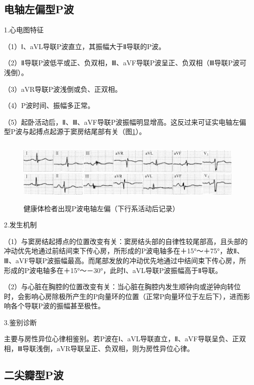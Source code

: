 \protect\hypertarget{text00007.htmlux5cux23subid3}{}{}

\subsection{电轴左偏型P波}

1.心电图特征

（1）Ⅰ、aVL导联P波直立，其振幅大于Ⅱ导联的P波。

（2）Ⅱ导联P波低平或正、负双相，Ⅲ、aVF导联P波呈正、负双相（Ⅲ导联P波可浅倒）。

（3）aVR导联P波浅倒或负、正双相。

（4）P波时间、振幅多正常。

（5）起卧活动后，Ⅱ、Ⅲ、aVF导联P波振幅明显增高。这反过来可证实电轴左偏型P波与起搏点起源于窦房结尾部有关（图\ref{fig1-1}）。

\begin{figure}[!htbp]
 \centering
 \includegraphics[width=5.78125in,height=1.22917in]{./images/Image00006.jpg}
 \captionsetup{justification=centering}
 \caption{健康体检者出现P波电轴左偏（下行系活动后记录）}
 \label{fig1-1}
  \end{figure} 

2.发生机制

（1）与窦房结起搏点的位置改变有关：窦房结头部的自律性较尾部高，且头部的冲动优先地通过前结间束下传心房，所形成的P波电轴多在＋15°～＋75°，故Ⅱ、Ⅲ、aVF导联P波振幅最高。而尾部发放的冲动优先地通过中结间束下传心房，所形成的P波电轴多在＋15°～－30°，此时Ⅰ、aVL导联P波振幅高于Ⅱ导联。

（2）与心脏在胸腔的位置改变有关：当心脏在胸腔内发生顺钟向或逆钟向转位时，会影响心房除极所产生的P向量环的位置（正常P向量环位于左后下），进而影响各个导联P波的振幅甚至极性。

3.鉴别诊断

主要与房性异位心律相鉴别。若P波在Ⅰ、aVL导联直立，Ⅱ、aVF导联呈负、正双相，Ⅲ导联浅倒，aVR导联呈正、负双相，则为房性异位心律。

\protect\hypertarget{text00007.htmlux5cux23subid4}{}{}

\subsection{二尖瓣型P波}

